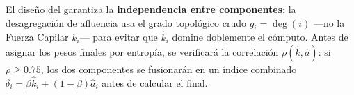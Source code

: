 El diseño del  garantiza la
\textbf{independencia entre componentes}: la desagregación de afluencia usa el
grado topológico crudo $g_i = \deg(i)$ —no la Fuerza Capilar $k_i$— para evitar
que $\hat{k}_i$ domine doblemente el cómputo. Antes de asignar los pesos finales
por entropía, se verificará la correlación $\rho(\hat{k}, \hat{a})$: si
$\rho \geq 0.75$, los dos componentes se fusionarán en un índice combinado
$\delta_i = \beta \hat{k}_i + (1-\beta)\hat{a}_i$ antes de calcular el
 final.
